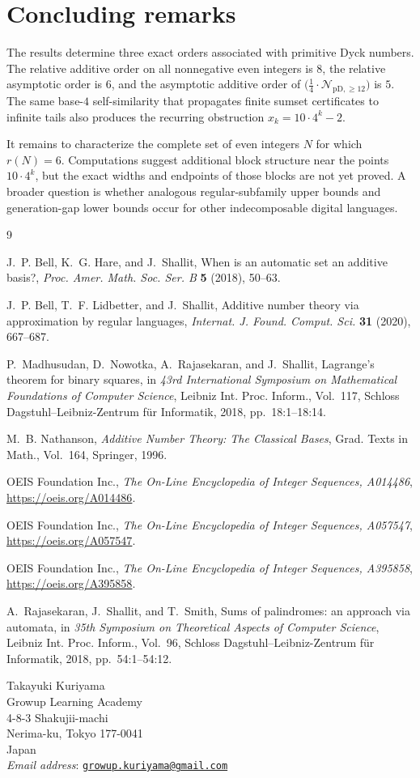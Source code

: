\documentclass[12pt]{article}
\theoremstyle{plain}
\theoremstyle{definition}
\theoremstyle{plain}
\newcommand{\Pset}{%
  \bigl(\tfrac{1}{4}\cdot\mathcal{N}_{\mathrm{pD},\geq 12}\bigr)%
}
\begin{document}
\section{Concluding remarks}

The results determine three exact orders associated with primitive Dyck
numbers.  The relative additive order on all nonnegative even integers is
$8$, the relative asymptotic order is $6$, and the asymptotic additive
order of $\Pset$ is $5$.  The same base-$4$ self-similarity that propagates
finite sumset certificates to infinite tails also produces the recurring
obstruction $x_k=10\cdot4^k-2$.

It remains to characterize the complete set of even integers $N$ for which
$r(N)=6$.  Computations suggest additional block structure near the points
$10\cdot4^k$, but the exact widths and endpoints of those blocks are not
yet proved.  A broader question is whether analogous regular-subfamily
upper bounds and generation-gap lower bounds occur for other indecomposable
digital languages.

\begin{thebibliography}{9}

J.~P. Bell, K.~G. Hare, and J.~Shallit,
When is an automatic set an additive basis?,
\emph{Proc. Amer. Math. Soc. Ser. B} \textbf{5} (2018), 50--63.

J.~P. Bell, T.~F. Lidbetter, and J.~Shallit,
Additive number theory via approximation by regular languages,
\emph{Internat. J. Found. Comput. Sci.} \textbf{31} (2020), 667--687.

P.~Madhusudan, D.~Nowotka, A.~Rajasekaran, and J.~Shallit,
Lagrange's theorem for binary squares,
in \emph{43rd International Symposium on Mathematical Foundations of
Computer Science}, Leibniz Int. Proc. Inform., Vol.~117, Schloss
Dagstuhl--Leibniz-Zentrum f{\"u}r Informatik, 2018, pp.~18:1--18:14.

M.~B. Nathanson,
\emph{Additive Number Theory: The Classical Bases},
Grad. Texts in Math., Vol.~164, Springer, 1996.

OEIS Foundation Inc.,
\emph{The On-Line Encyclopedia of Integer Sequences, A014486},
\url{https://oeis.org/A014486}.

OEIS Foundation Inc.,
\emph{The On-Line Encyclopedia of Integer Sequences, A057547},
\url{https://oeis.org/A057547}.

OEIS Foundation Inc.,
\emph{The On-Line Encyclopedia of Integer Sequences, A395858},
\url{https://oeis.org/A395858}.

A.~Rajasekaran, J.~Shallit, and T.~Smith,
Sums of palindromes: an approach via automata,
in \emph{35th Symposium on Theoretical Aspects of Computer Science},
Leibniz Int. Proc. Inform., Vol.~96, Schloss Dagstuhl--Leibniz-Zentrum
f{\"u}r Informatik, 2018, pp.~54:1--54:12.

\end{thebibliography}


\begin{flushleft}
Takayuki Kuriyama\\
Growup Learning Academy\\
4-8-3 Shakujii-machi\\
Nerima-ku, Tokyo 177-0041\\
Japan\\
\textit{Email address}: \href{mailto:growup.kuriyama@gmail.com}
{\texttt{growup.kuriyama@gmail.com}}
\end{flushleft}
\end{document}
